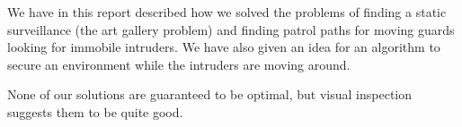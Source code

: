 We have in this report described how we solved the problems of finding a static surveillance (the art gallery problem) and finding patrol paths for moving guards looking for immobile intruders.
We have also given an idea for an algorithm to secure an environment while the intruders are moving around.

None of our solutions are guaranteed to be optimal, but visual inspection suggests them to be quite good.
